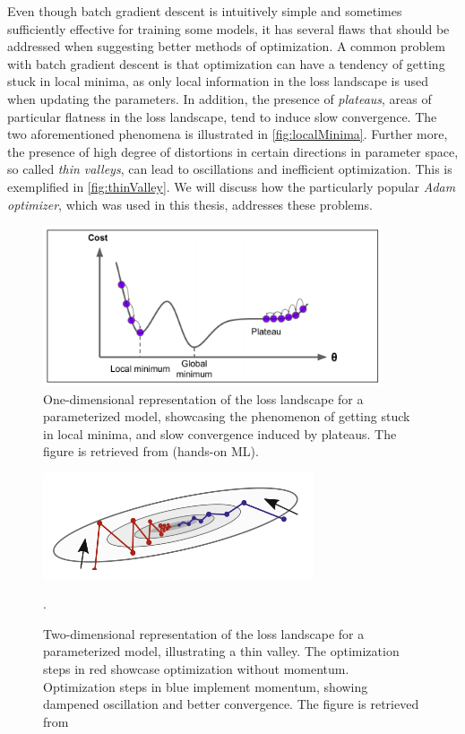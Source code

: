 Even though batch gradient descent is intuitively simple and sometimes sufficiently effective for training some models, it has several flaws that should be addressed when suggesting better methods of optimization. A common problem with batch gradient descent is that optimization can have a tendency of getting stuck in local minima, as only local information in the loss landscape is used when updating the parameters. In addition, the presence of \emph{plateaus}, areas of particular flatness in the loss landscape, tend to induce slow convergence. The two aforementioned phenomena is illustrated in \autoref{fig:localMinima}. Further more, the presence of high degree of distortions in certain directions in parameter space, so called  \emph{thin valleys}, can lead to oscillations and inefficient optimization. This is exemplified in \autoref{fig:thinValley}. We will discuss how the particularly popular \emph{Adam optimizer}, which was used in this thesis, addresses these problems. 


\begin{figure}[htp]
    \centering
    \includegraphics[width=10cm]{latex/figures/local_minimum_saddle_point.png}
    \caption{One-dimensional representation of the loss landscape for a parameterized model, showcasing the phenomenon of getting stuck in local minima, and slow convergence induced by plateaus. The figure is retrieved from (hands-on ML).}
    \label{fig:localMinima}
\end{figure}

\begin{figure}[htp]
    \centering
    \includegraphics[width=8cm]{latex/figures/thin_vally.png}
    \caption{Two-dimensional representation of the loss landscape for a parameterized model, illustrating a thin valley. The optimization steps in red showcase optimization without momentum. Optimization steps in blue implement momentum, showing dampened oscillation and better convergence. The figure is retrieved from \citet{SupervisedwquantumComputers}}.
    \label{fig:thinValley}
\end{figure}

